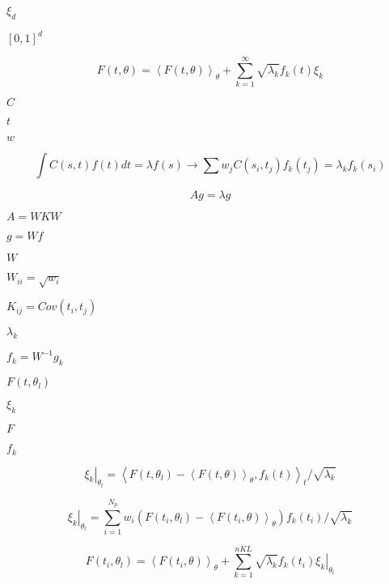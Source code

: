 \documentclass{article}
\begin{document}
$\xi_d$
\pagebreak

$[0,1]^d$
\pagebreak

\[
F(t,\theta) = \left < F(t,\theta) \right >_{\theta}
              + \sum_{k=1}^{\infty} \sqrt{\lambda_k} f_k(t) \xi_k\]
\pagebreak

$C$
\pagebreak

$t$
\pagebreak

$w$
\pagebreak

\[ \int C(s,t)f(t)dt=\lambda f(s) \rightarrow \sum w_j C(s_i,t_j) f_k(t_j) = \lambda_k f_k(s_i)\]
\pagebreak

\[A g=\lambda g \]
\pagebreak

$A=W K W$
\pagebreak

$g=Wf$
\pagebreak

$W$
\pagebreak

$W_{ii}=\sqrt{w_i}$
\pagebreak

$K_{ij}=Cov(t_i,t_j)$
\pagebreak

$\lambda_k$
\pagebreak

$f_k=W^{-1}g_k$
\pagebreak

$F(t,\theta_l)$
\pagebreak

$\xi_k$
\pagebreak

$F$
\pagebreak

$f_k$
\pagebreak

\[ \left.\xi_k\right\vert_{\theta_l}=\left <F(t,\theta_l)-\left <
  F(t,\theta) \right >_{\theta}, f_k(t) \right >_t/\sqrt{\lambda_k} \]
\pagebreak

\[
\left.\xi_k\right\vert_{\theta_l}=\sum_{i=1}^{N_p} w_i\left(F(t_i,\theta_l)-\left <
  F(t_i,\theta) \right >_{\theta} \right) f_k(t_i)/\sqrt{\lambda_k} \]
\pagebreak

\[
  F(t_i,\theta_l) = \left < F(t_i,\theta) \right >_{\theta}
                        + \sum_{k=1}^{nKL} \sqrt{\lambda_k} f_k(t_i) \left. \xi_k\right\vert_{\theta_l}

\]
\pagebreak
\end{document}
